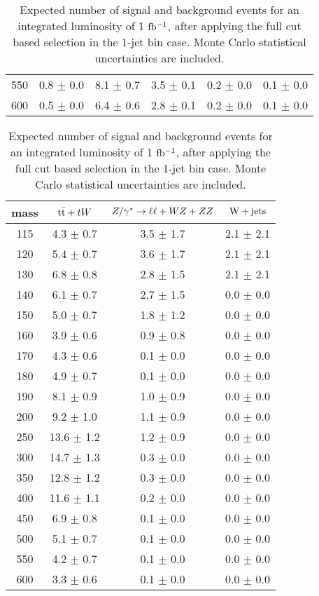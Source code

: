 \begin{table}[!ht]
\begin{center}
{\begin{tabular} {|c|c|c|c|c|c|}
550 &   0.8 $\pm$   0.0 &  8.1  $\pm$	 0.7  &   3.5 $\pm$	0.1 &	0.2 $\pm$   0.0 &   0.1 $\pm$	0.0 \\
600 &   0.5 $\pm$   0.0 &  6.4  $\pm$	 0.6  &   2.8 $\pm$	0.1 &	0.2 $\pm$   0.0 &   0.1 $\pm$	0.0 \\
 \hline
  \end{tabular}
  }
 {\normalsize
  \begin{tabular} {|c|c|c|c|}
\hline
  mass    & $\mathrm{t}\bar{\mathrm{t}}+tW$ & $Z/\gamma^*\to\ell\ell+WZ+ZZ$ & $\mathrm{W+jets}$ \\
  \hline
  \hline
115 &   4.3 $\pm$   0.7 &  3.5 $\pm$   1.7 &   2.1 $\pm$   2.1  \\
120 &   5.4 $\pm$   0.7 &  3.6 $\pm$   1.7 &   2.1 $\pm$   2.1  \\
130 &   6.8 $\pm$   0.8 &  2.8 $\pm$   1.5 &   2.1 $\pm$   2.1  \\
140 &   6.1 $\pm$   0.7 &  2.7 $\pm$   1.5 &   0.0 $\pm$   0.0  \\
150 &   5.0 $\pm$   0.7 &  1.8 $\pm$   1.2 &   0.0 $\pm$   0.0  \\
160 &   3.9 $\pm$   0.6 &  0.9 $\pm$   0.8 &   0.0 $\pm$   0.0  \\
170 &   4.3 $\pm$   0.6 &  0.1 $\pm$   0.0 &   0.0 $\pm$   0.0  \\
180 &   4.9 $\pm$   0.7 &  0.1 $\pm$   0.0 &   0.0 $\pm$   0.0  \\
190 &   8.1 $\pm$   0.9 &  1.0 $\pm$   0.9 &   0.0 $\pm$   0.0  \\
200 &   9.2 $\pm$   1.0 &  1.1 $\pm$   0.9 &   0.0 $\pm$   0.0  \\
250 &  13.6 $\pm$   1.2 &  1.2 $\pm$   0.9 &   0.0 $\pm$   0.0  \\
300 &  14.7 $\pm$   1.3 &  0.3 $\pm$   0.0 &   0.0 $\pm$   0.0  \\
350 &  12.8 $\pm$   1.2 &  0.3 $\pm$   0.0 &   0.0 $\pm$   0.0  \\
400 &  11.6 $\pm$   1.1 &  0.2 $\pm$   0.0 &   0.0 $\pm$   0.0  \\
450 &   6.9 $\pm$   0.8 &  0.1 $\pm$   0.0 &   0.0 $\pm$   0.0  \\
500 &   5.1 $\pm$   0.7 &  0.1 $\pm$   0.0 &   0.0 $\pm$   0.0  \\
550 &   4.2 $\pm$   0.7 &  0.1 $\pm$   0.0 &   0.0 $\pm$   0.0  \\
600 &   3.3 $\pm$   0.6 &  0.1 $\pm$   0.0 &   0.0 $\pm$   0.0  \\
 \hline
  \end{tabular}
  }
  \caption{Expected number of signal and background events for an 
  integrated luminosity of 1 $\mathrm{fb^{-1}}$, after applying the full cut based 
  selection in the 1-jet bin case. Monte Carlo statistical uncertainties are included.}
   \label{tab:hwwselection1j}
  \end{center}
\end{table}
